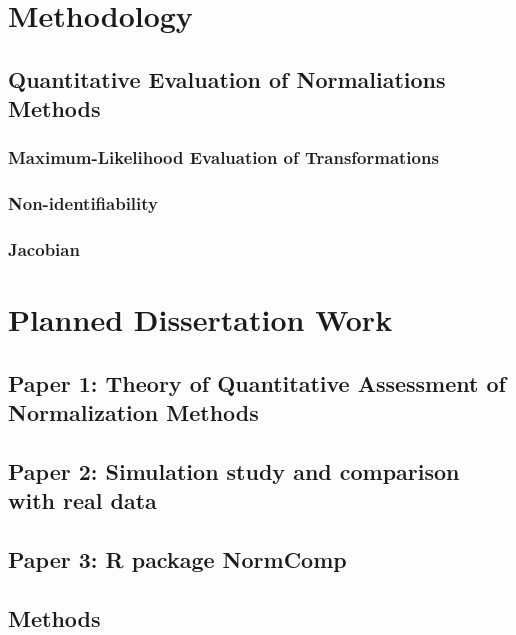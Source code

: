 \documentclass{book}\usepackage[]{graphicx}\usepackage[]{color}
\begin{document}
\chapter{Methodology}

\section{Quantitative Evaluation of Normaliations Methods}

\subsection{Maximum-Likelihood Evaluation of Transformations}

\subsection{Non-identifiability}

\subsection{Jacobian}

\chapter{Planned Dissertation Work}

\section{Paper 1:  Theory of Quantitative Assessment of Normalization Methods}

\section{Paper 2:  Simulation study and comparison with real data}

\section{Paper 3:  R package NormComp}



\section{Methods}
\end{document}
